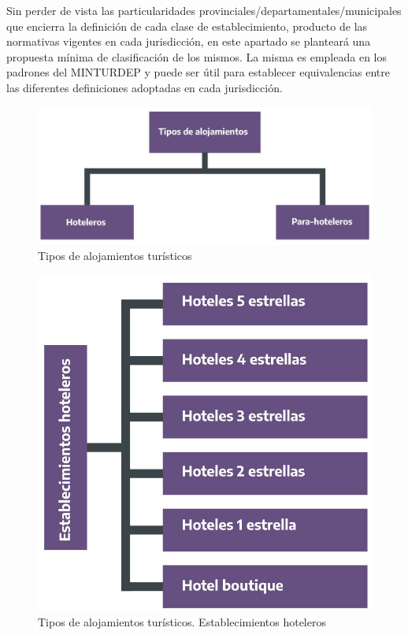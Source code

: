\documentclass[
]{book}
\begin{document}
Sin perder de vista las particularidades provinciales/departamentales/municipales que encierra la definición de cada clase de establecimiento, producto de las normativas vigentes en cada jurisdicción, en este apartado se planteará una propuesta mínima de clasificación de los mismos. La misma es empleada en los padrones del MINTURDEP y puede ser útil para establecer equivalencias entre las diferentes definiciones adoptadas en cada jurisdicción.

\begin{figure}

{\centering \includegraphics[width=1\linewidth]{imagenes/figura_3} 

}

\caption{Tipos de alojamientos turísticos}\label{fig:tipos-alojamientos}
\end{figure}

\begin{figure}

{\centering \includegraphics[width=1\linewidth]{imagenes/figura_3_1} 

}

\caption{Tipos de alojamientos turísticos. Establecimientos hoteleros}\label{fig:establecimientos-hoteleros}
\end{figure}
\end{document}
